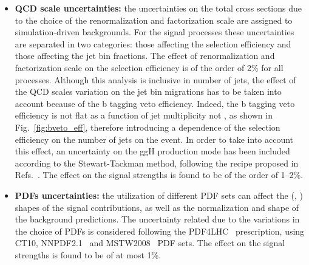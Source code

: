 \begin{itemize}

\item {\bf QCD scale uncertainties:}
the uncertainties on the total cross sections due to the choice of the renormalization and factorization scale are assigned to simulation-driven backgrounds. For the signal processes these uncertainties are separated in two categories: those affecting the selection efficiency and those affecting the jet bin fractions. The effect of renormalization and factorization scale on the selection efficiency is of the order of 2\% for all processes. Although this analysis is inclusive in number of jets, the effect of the QCD scales variation on the jet bin migrations has to be taken into account because of the b tagging veto efficiency. Indeed, the b tagging veto efficiency is not flat as a function of jet multiplicity not \pth, as shown in Fig.~\ref{fig:bveto_eff}, therefore introducing a dependence of the selection efficiency on the number of jets on the event.
In order to take into account this effect, an uncertainty on the ggH production mode has been included according to the Stewart-Tackman method, following the recipe proposed in Refs.~\cite{Stewart:2011cf,Heinemeyer:2013tqa}. The effect on the signal strengths is found to be of the order of 1--2\%.

\item {\bf PDFs uncertainties:} 
the utilization of different PDF sets can affect the (\mll, \mt) shapes of the signal contributions, as well as the normalization and shape of the background predictions. The uncertainty related due to the variations in the choice of PDFs is considered following the PDF4LHC~\cite{Alekhin:2011sk,Botje:2011sn} prescription, using CT10, NNPDF2.1~\cite{Ball:2011mu} and MSTW2008~\cite{Martin:2009iq} PDF sets. The effect on the signal strengths is found to be of at most 1\%.

\end{itemize} 

